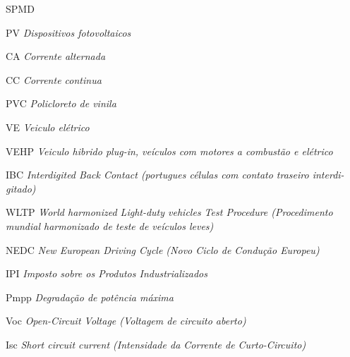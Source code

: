 \begin{listofabbrv}{SPMD}

        \item[PV]  {\textit{Dispositivos fotovoltaicos}}
        \item[CA]  {\textit{Corrente alternada}}
        \item[CC]  {\textit{Corrente continua}}
        \item[PVC]  {\textit{Policloreto de vinila}}
        \item[VE]  {\textit{Veiculo elétrico}}
        \item[VEHP]  {\textit{Veiculo hibrido plug-in, veículos com motores a combustão e elétrico}}
        \item[IBC]  {\textit{Interdigited Back Contact (portugues células com contato traseiro interdi-gitado)}}
        \item[WLTP]  {\textit{World harmonized Light-duty vehicles Test Procedure (Procedimento mundial harmonizado de teste de veículos leves)}}
        \item[NEDC]  {\textit{New European Driving Cycle (Novo Ciclo de Condução Europeu)}}
        \item[IPI]  {\textit{Imposto sobre os Produtos Industrializados}}
        \item[Pmpp]  {\textit{Degradação de potência máxima}}
        \item[Voc]  {\textit{Open-Circuit Voltage (Voltagem de circuito aberto)}}
        \item[Isc]  {\textit{Short circuit current (Intensidade da Corrente de Curto-Circuito)}}

\end{listofabbrv}